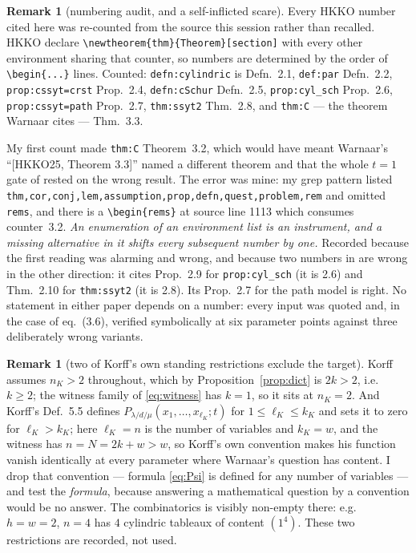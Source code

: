 \documentclass[11pt]{article}
\theoremstyle{definition}
\newtheorem{remark}[theorem]{Remark}
\newcommand{\la}{\lambda}
\begin{document}
\begin{remark}[numbering audit, and a self-inflicted scare]\label{rem:numbering}
Every HKKO number cited here was re-counted from the source this session rather
than recalled. HKKO declare \verb|\newtheorem{thm}{Theorem}[section]| with every
other environment sharing that counter, so numbers are determined by the order of
\verb|\begin{...}| lines. Counted: \texttt{defn:cylindric} is Defn.~2.1,
\texttt{def:par} Defn.~2.2, \texttt{prop:cssyt=crst} Prop.~2.4,
\texttt{defn:cSchur} Defn.~2.5, \texttt{prop:cyl\_sch} Prop.~2.6,
\texttt{prop:cssyt=path} Prop.~2.7, \texttt{thm:ssyt2} Thm.~2.8, and
\texttt{thm:C} --- the theorem Warnaar cites --- Thm.~3.3.

My first count made \texttt{thm:C} Theorem~3.2, which would have meant Warnaar's
``[HKKO25, Theorem 3.3]'' named a different theorem and that the whole $t=1$ gate of
\cite{Cq405} rested on the wrong result. The error was mine: my grep pattern listed
\texttt{thm,cor,conj,lem,assumption,prop,defn,quest,problem,rem} and omitted
\texttt{rems}, and there is a \verb|\begin{rems}| at source line 1113 which consumes
counter~3.2. \emph{An enumeration of an environment list is an instrument, and a
missing alternative in it shifts every subsequent number by one.} Recorded because
the first reading was alarming and wrong, and because two numbers in \cite{Cq405}
are wrong in the other direction: it cites Prop.~2.9 for \texttt{prop:cyl\_sch}
(it is 2.6) and Thm.~2.10 for \texttt{thm:ssyt2} (it is 2.8). Its Prop.~2.7 for the
path model is right. No statement in either paper depends on a number: every input
was quoted and, in the case of eq.~(3.6), verified symbolically at six parameter
points against three deliberately wrong variants.
\end{remark}

\begin{remark}[two of Korff's own standing restrictions exclude the target]
\label{rem:range}
Korff assumes $n_K>2$ throughout, which by Proposition~\ref{prop:dict} is
$2k>2$, i.e.\ $k\ge2$; the witness family of \eqref{eq:witness} has $k=1$, so it
sits at $n_K=2$. And Korff's Def.~5.5 defines
$P_{\la/d/\mu}(x_1,\dots,x_{\ell_K};t)$ for $1\le\ell_K\le k_K$ and sets it to
zero for $\ell_K>k_K$; here $\ell_K=n$ is the number of variables and
$k_K=w$, and the witness has $n=N=2k+w>w$, so Korff's own convention makes his
function vanish identically at every parameter where Warnaar's question has
content. I drop that convention --- formula \eqref{eq:Psi} is defined for any
number of variables --- and test the \emph{formula}, because answering a
mathematical question by a convention would be no answer. The combinatorics is
visibly non-empty there: e.g.\ $h=w=2$, $n=4$ has $4$ cylindric tableaux of
content $(1^4)$. These two restrictions are recorded, not used.
\end{remark}
\end{document}
